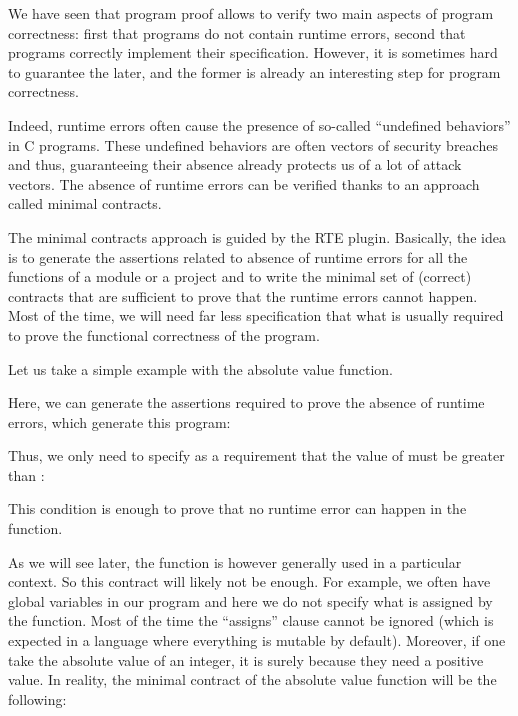 We have seen that program proof allows to verify two main aspects of program
correctness: first that programs do not contain runtime errors, second that
programs correctly implement their specification. However, it is sometimes hard
to guarantee the later, and the former is already an interesting step for
program correctness.

Indeed, runtime errors often cause the presence of so-called ``undefined
behaviors'' in C programs. These undefined behaviors are often vectors of
security breaches and thus, guaranteeing their absence already protects us of a
lot of attack vectors. The absence of runtime errors can be verified thanks to
an approach called minimal contracts.




The minimal contracts approach is guided by the RTE plugin. Basically, the idea
is to generate the assertions related to absence of runtime errors for all the
functions of a module or a project and to write the minimal set of (correct)
contracts that are sufficient to prove that the runtime errors cannot happen.
Most of the time, we will need far less specification that what is usually
required to prove the functional correctness of the program.


Let us take a simple example with the absolute value function.




Here, we can generate the assertions required to prove the absence of runtime
errors, which generate this program:




Thus, we only need to specify as a requirement that the value of 
must be greater than :




This condition is enough to prove that no runtime error can happen in the
function.


As we will see later, the function is however generally used in a particular
context. So this contract will likely not be enough. For
example, we often have global variables in our program and here we do not
specify what is assigned by the function. Most of the time the ``assigns''
clause cannot be ignored (which is expected in a language where everything is
mutable by default). Moreover, if one take the absolute value of an integer,
it is surely because they need a positive value. In reality, the minimal
contract of the absolute value function will be the following:


